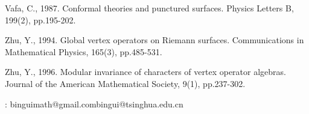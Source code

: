 \documentclass[11pt,b5paper,notitlepage]{article}
\theoremstyle{definition}
\theoremstyle{plain}
\numberwithin{equation}{section}
\begin{document}
\begin{thebibliography}{999999}
Vafa, C., 1987. Conformal theories and punctured surfaces. Physics Letters B, 199(2), pp.195-202.	
		
Zhu, Y., 1994. Global vertex operators on Riemann surfaces. Communications in Mathematical Physics, 165(3), pp.485-531.
		
Zhu, Y., 1996. Modular invariance of characters of vertex operator algebras. Journal of the American Mathematical Society, 9(1), pp.237-302.
		
		
		
		
		
	\end{thebibliography}


: binguimath@gmail.com\qquad bingui@tsinghua.edu.cn
\end{document}
